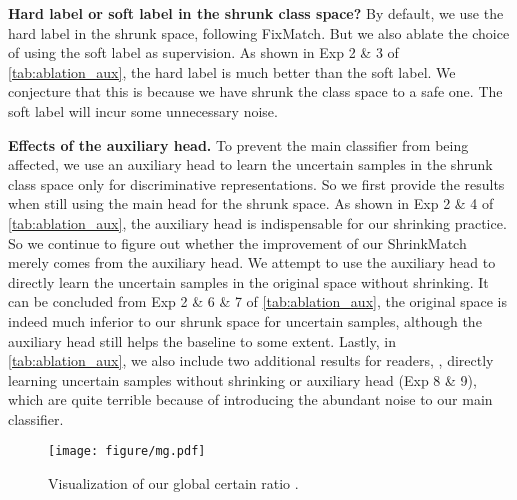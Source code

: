 \documentclass[10pt,twocolumn,letterpaper]{article}
\begin{document}
\vspace{1mm}
\noindent
\textbf{Hard label or soft label in the shrunk class space?} By default, we use the hard label in the shrunk space, following FixMatch. But we also ablate the choice of using the soft label as supervision. As shown in Exp 2 \& 3 of \cref{tab:ablation_aux}, the hard label is much better than the soft label. We conjecture that this is because we have shrunk the class space to a safe one. The soft label will incur some unnecessary noise.

\vspace{1mm}
\noindent
\textbf{Effects of the auxiliary head.}
To prevent the main classifier from being affected, we use an auxiliary head to learn the uncertain samples in the shrunk class space only for discriminative representations. So we first provide the results when still using the main head for the shrunk space. As shown in Exp 2 \& 4 of \cref{tab:ablation_aux}, the auxiliary head is indispensable for our shrinking practice. So we continue to figure out whether the improvement of our ShrinkMatch merely comes from the auxiliary head. We attempt to use the auxiliary head to directly learn the uncertain samples in the original space without shrinking. It can be concluded from Exp 2 \& 6 \& 7 of \cref{tab:ablation_aux}, the original space is indeed much inferior to our shrunk space for uncertain samples, although the auxiliary head still helps the baseline to some extent. Lastly, in \cref{tab:ablation_aux}, we also include two additional results for readers, \ie, directly learning uncertain samples without shrinking or auxiliary head (Exp 8 \& 9), which are quite terrible because of introducing the abundant noise to our main classifier.

\begin{figure}
    \centering
    \texttt{[image: figure/mg.pdf]}
    \vspace{-2mm}
    \caption{Visualization of our global certain ratio .}
    \vspace{-2mm}
    \label{fig:mg}
\end{figure}
\end{document}
